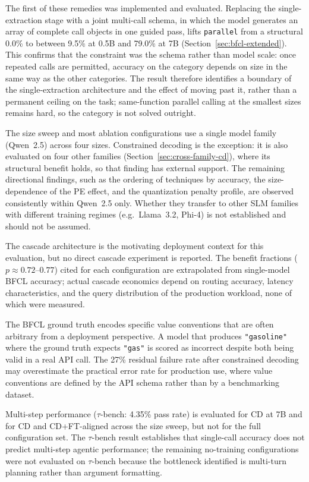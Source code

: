 The first of these remedies was implemented and evaluated. Replacing the
single-extraction stage with a joint multi-call schema, in which the model
generates an array of complete call objects in one guided pass, lifts
\texttt{parallel} from a structural 0.0\% to between 9.5\% at 0.5B and 79.0\%
at 7B (Section~\ref{sec:bfcl-extended}). This confirms that the constraint
was the schema rather than model scale: once repeated calls are permitted,
accuracy on the category depends on size in the same way as the other
categories. The result therefore identifies a boundary of the
single-extraction architecture and the effect of moving past it, rather than
a permanent ceiling on the task; same-function parallel calling at the
smallest sizes remains hard, so the category is not solved outright.

The size sweep and most ablation configurations use a single model
family (Qwen~2.5) across four sizes. Constrained decoding is the
exception: it is also evaluated on four other families
(Section~\ref{sec:cross-family-cd}), where its structural benefit holds,
so that finding has external support. The remaining directional findings,
such as the ordering of techniques by accuracy, the size-dependence of
the PE effect, and the quantization penalty profile, are observed
consistently within Qwen~2.5 only. Whether they transfer to other SLM
families with different training regimes (e.g.\ Llama~3.2, Phi-4) is not
established and should not be assumed.

The cascade architecture is the motivating deployment context for this
evaluation, but no direct cascade experiment is reported. The benefit
fractions ($p \approx 0.72$--$0.77$) cited for each configuration are
extrapolated from single-model BFCL accuracy; actual cascade economics
depend on routing accuracy, latency characteristics, and the query
distribution of the production workload, none of which were measured.

The BFCL ground truth encodes specific value conventions that are often
arbitrary from a deployment perspective. A model that produces
\texttt{"gasoline"} where the ground truth expects \texttt{"gas"} is scored
as incorrect despite both being valid in a real API call. The 27\% residual
failure rate after constrained decoding may overestimate the practical error
rate for production use, where value conventions are defined by the API
schema rather than by a benchmarking dataset.

Multi-step performance ($\tau$-bench: 4.35\% pass rate) is evaluated for
CD at 7B and for CD and CD+FT-aligned across the size sweep, but not for
the full configuration set. The $\tau$-bench result establishes that
single-call accuracy does not predict multi-step agentic performance; the
remaining no-training configurations were not evaluated on $\tau$-bench
because the bottleneck identified is multi-turn planning rather than
argument formatting.

